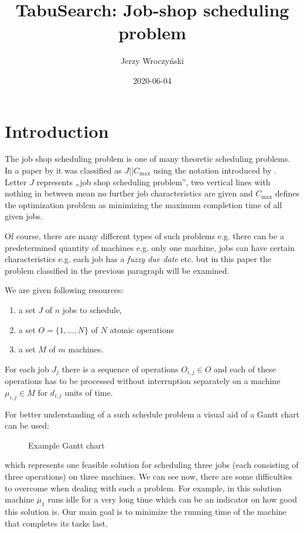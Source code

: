 \documentclass[14pt]{article}
\title{TabuSearch: Job-shop scheduling problem}
\author{Jerzy Wroczyński}
\date{2020-06-04}
\begin{document}
\maketitle

\section{Introduction}

The job shop scheduling problem is one of many theoretic scheduling problems. In a paper by \citet{amico-trubian} it was classified as $J || C_{\max}$ using the notation introduced by \citet{graham}. Letter $J$ represents „job shop scheduling problem”, two vertical lines with nothing in between mean no further job characteristics are given and $C_{\max}$ defines the optimization problem as minimizing the maximum completion time of all given jobs.

Of course, there are many different types of such problems e.g. there can be a predetermined quantity of machines e.g. only one machine, jobs can have certain characteristics e.g. each job has a \textit{fuzzy due date} etc. but in this paper the problem classified in the previous paragraph will be examined.

\hspace{2pt}

We are given following resources:
\begin{enumerate}
  \item a set $J$ of $n$ jobs to schedule,
  \item a set $O = \{1,\dots,N\}$ of $N$ atomic operations
  \item a set $M$ of $m$ machines.
\end{enumerate}

For each job $J_j$ there is a sequence of operations $O_{i,j} \in O$ and each of these operations has to be processed without interruption separately on a machine $\mu_{i,j} \in M$ for $d_{i,j}$ units of time.

For better understanding of a such schedule problem a visual aid of a Gantt chart can be used:
\begin{figure}[H]
  \centering
  \def\svgwidth{\columnwidth}
  
  \caption{Example Gantt chart}
  \label{example-gantt}
\end{figure}
which represents one feasible solution for scheduling three jobs (each consisting of three operations) on three machines. We can see now, there are some difficulties to overcome when dealing with such a problem. For example, in this solution machine $\mu_1$ runs idle for a very long time which can be an indicator on how good this solution is. Our main goal is to minimize the running time of the machine that completes its tasks last.
\end{document}

